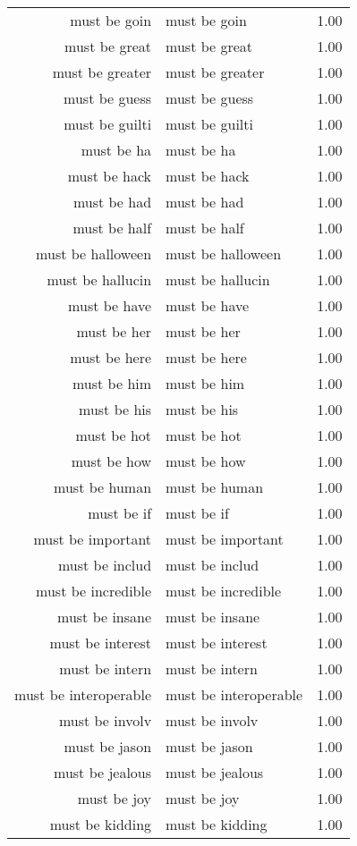 \begin{table}[ht]
\begin{tabular}{rlr}
  must be goin & must be goin & 1.00 \\ 
  must be great & must be great & 1.00 \\ 
  must be greater & must be greater & 1.00 \\ 
  must be guess & must be guess & 1.00 \\ 
  must be guilti & must be guilti & 1.00 \\ 
  must be ha & must be ha & 1.00 \\ 
  must be hack & must be hack & 1.00 \\ 
  must be had & must be had & 1.00 \\ 
  must be half & must be half & 1.00 \\ 
  must be halloween & must be halloween & 1.00 \\ 
  must be hallucin & must be hallucin & 1.00 \\ 
  must be have & must be have & 1.00 \\ 
  must be her & must be her & 1.00 \\ 
  must be here & must be here & 1.00 \\ 
  must be him & must be him & 1.00 \\ 
  must be his & must be his & 1.00 \\ 
  must be hot & must be hot & 1.00 \\ 
  must be how & must be how & 1.00 \\ 
  must be human & must be human & 1.00 \\ 
  must be if & must be if & 1.00 \\ 
  must be important & must be important & 1.00 \\ 
  must be includ & must be includ & 1.00 \\ 
  must be incredible & must be incredible & 1.00 \\ 
  must be insane & must be insane & 1.00 \\ 
  must be interest & must be interest & 1.00 \\ 
  must be intern & must be intern & 1.00 \\ 
  must be interoperable & must be interoperable & 1.00 \\ 
  must be involv & must be involv & 1.00 \\ 
  must be jason & must be jason & 1.00 \\ 
  must be jealous & must be jealous & 1.00 \\ 
  must be joy & must be joy & 1.00 \\ 
  must be kidding & must be kidding & 1.00 \\ 

\end{tabular}
\end{table}
